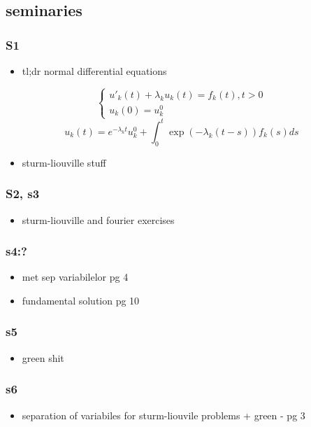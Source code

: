 \documentclass[11pt]{article}
\begin{document}
\subsection*{seminaries}
\label{sec:org6900a23}
\subsubsection*{S1}
\label{sec:orga975c03}
\begin{itemize}
\item tl;dr normal differential equations
\end{itemize}
\[
\begin{cases}
u'_k(t) + \lambda_k u_k(t) = f_k(t), t>0\\
u_k(0) = u_k^0
\end{cases}
\]\[
u_k(t) = e^{-\lambda_kt} u_k^0 + \int_0^t \exp(-\lambda_k(t-s)) f_k(s)ds
\]
\begin{itemize}
\item sturm-liouville stuff
\end{itemize}
\subsubsection*{S2, s3}
\label{sec:org3efb36f}
\begin{itemize}
\item sturm-liouville and fourier exercises
\end{itemize}
\subsubsection*{s4:?}
\label{sec:orge757ba8}
\begin{itemize}
\item met sep variabilelor pg 4
\item fundamental solution pg 10
\end{itemize}
\subsubsection*{s5}
\label{sec:orgc82e89d}
\begin{itemize}
\item green shit
\end{itemize}
\subsubsection*{s6}
\label{sec:org28bba68}
\begin{itemize}
\item separation of variabiles for sturm-liouvile problems + green - pg 3
\end{itemize}
\end{document}
